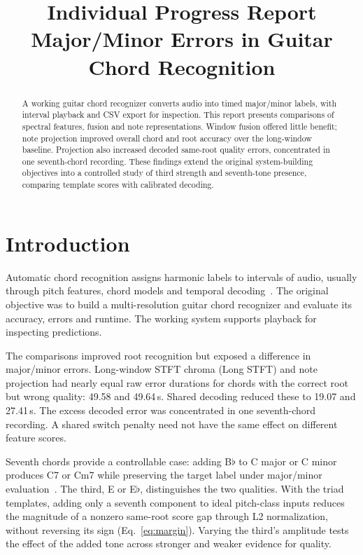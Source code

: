 \documentclass{article}
\title{Individual Progress Report \\ Major/Minor Errors in Guitar Chord Recognition}
\begin{document}
\maketitle


\begin{abstract}
A working guitar chord recognizer converts audio into timed major/minor labels, with interval playback and CSV export for inspection. This report presents comparisons of spectral features, fusion and note representations. Window fusion offered little benefit; note projection improved overall chord and root accuracy over the long-window baseline. Projection also increased decoded same-root quality errors, concentrated in one seventh-chord recording. These findings extend the original system-building objectives into a controlled study of third strength and seventh-tone presence, comparing template scores with calibrated decoding.
\end{abstract}

\section{Introduction}
Automatic chord recognition assigns harmonic labels to intervals of audio, usually through pitch features, chord models and temporal decoding\ \cite{mcvicar2014,pauwels2019,mueller2021fmp}. The original objective was to build a multi-resolution guitar chord recognizer and evaluate its accuracy, errors and runtime. The working system supports playback for inspecting predictions.

The comparisons improved root recognition but exposed a difference in major/minor errors. Long-window STFT chroma (Long STFT) and note projection had nearly equal raw error durations for chords with the correct root but wrong quality: 49.58 and 49.64\,s. Shared decoding reduced these to 19.07 and 27.41\,s. The excess decoded error was concentrated in one seventh-chord recording. A shared switch penalty need not have the same effect on different feature scores.

Seventh chords provide a controllable case: adding B$\flat$ to C major or C minor produces C7 or Cm7 while preserving the target label under major/minor evaluation\ \cite{humphrey2015,koops2019}. The third, E or E$\flat$, distinguishes the two qualities. With the triad templates, adding only a seventh component to ideal pitch-class inputs reduces the magnitude of a nonzero same-root score gap through L2 normalization, without reversing its sign (Eq.~\ref{eq:margin}). Varying the third's amplitude tests the effect of the added tone across stronger and weaker evidence for quality.
\end{document}
